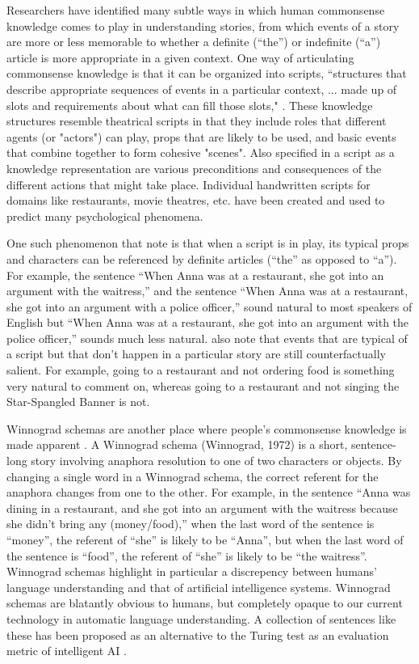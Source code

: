 \documentclass[10pt,a4paper]{article}
\begin{document}
Researchers have identified many subtle ways in which human commonsense knowledge comes to play in understanding stories, from which events of a story are more or less memorable to whether a definite (“the”) or indefinite (“a”) article is more appropriate in a given context. One way of articulating commonsense knowledge is that it can be organized into scripts, ``structures that describe appropriate sequences of events in a particular context, ... made up of slots and requirements about what can fill those slots," \cite{schank1977scripts}.
These knowledge structures resemble theatrical scripts in that they include roles that different agents (or "actors") can play, props that are likely to be used, and basic events that combine together to form cohesive "scenes".
Also specified in a script as a knowledge representation are various preconditions and consequences of the different actions that might take place.
Individual handwritten scripts for domains like restaurants, movie theatres, etc. have been created and used to predict many psychological phenomena.

One such phenomenon that  note is that when a script is in play, its typical props and characters can be referenced by definite articles (“the” as opposed to “a”). For example, the sentence “When Anna was at a restaurant, she got into an argument with the waitress,” and the sentence “When Anna was at a restaurant, she got into an argument with a police officer,” sound natural to most speakers of English but “When Anna was at a restaurant, she got into an argument with the police officer,” sounds much less natural.  also note that events that are typical of a script but that don’t happen in a particular story are still counterfactually salient. For example, going to a restaurant and not ordering food is something very natural to comment on, whereas going to a restaurant and not singing the Star-Spangled Banner is not.

Winnograd schemas are another place where people's commonsense knowledge is made apparent \cite{winograd1972understanding}.
A Winnograd schema (Winnograd, 1972) is a short, sentence-long story involving anaphora resolution to one of two characters or objects. By changing a single word in a Winnograd schema, the correct referent for the anaphora changes from one to the other. For example, in the sentence “Anna was dining in a restaurant, and she got into an argument with the waitress because she didn’t bring any (money/food),” when the last word of the sentence is “money”, the referent of “she” is likely to be “Anna”, but when the last word of the sentence is “food”, the referent of “she” is likely to be “the waitress”.
Winnograd schemas highlight in particular a discrepency between humans' language understanding and that of artificial intelligence systems.
Winnograd schemas are blatantly obvious to humans, but completely opaque to our current technology in automatic language understanding.
A collection of sentences like these has been proposed as an alternative to the Turing test as an evaluation metric of intelligent AI \cite{levesque2011winograd}.
\end{document}
